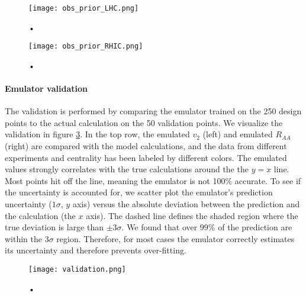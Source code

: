 \begin{figure}
\centering
\texttt{[image: obs\_prior\_LHC.png]}
\caption{•}
\label{fig:new:obs_prior_LHC}
\end{figure}

\begin{figure}
\centering
\texttt{[image: obs\_prior\_RHIC.png]}
\caption{•}
\label{fig:new:obs_prior_RHIC}
\end{figure}

\paragraph{Emulator validation} 
The validation is performed by comparing the emulator trained on the 250 design points to the actual calculation on the 50 validation points.
We visualize the validation in figure \ref{fig:new:validation}.
In the top row, the emulated $v_2$ (left) and emulated $R_{AA}$ (right) are compared with the model calculations, and the data from different experiments and centrality has been labeled by different colors.
The emulated values strongly correlates with the true calculations around the the $y=x$ line.
Most points hit off the line, meaning the emulator is not 100\% accurate.
To see if the uncertainty is accounted for, we scatter plot the emulator's prediction uncertainty ($1\sigma$, $y$ axis) versus the absolute deviation between the prediction and the calculation (the $x$ axis).
The dashed line defines the shaded region where the true deviation is large than $\pm 3\sigma$.
We found that over $99\%$ of the prediction are within the $3\sigma$ region.
Therefore, for most cases the emulator correctly estimates its uncertainty  and therefore prevents over-fitting.

\begin{figure}
\centering
\texttt{[image: validation.png]}
\caption{•}
\label{fig:new:validation}
\end{figure}

